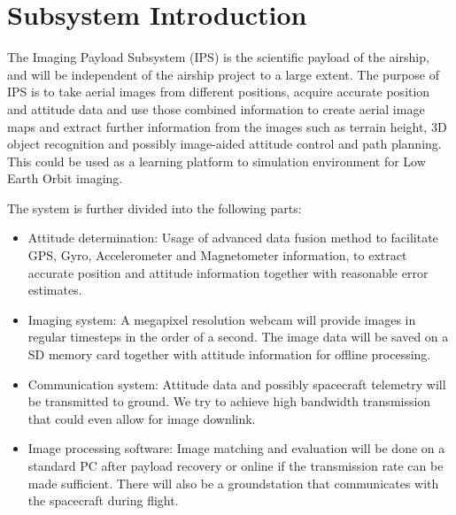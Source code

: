 \documentclass[fontsize=11pt,paper=a4,]{scrartcl}
\begin{document}
\sloppy



\pagestyle{plain}



\listoffigures
\newpage

\listoftables
\newpage

\tableofcontents
\newpage
\acresetall	%
\clearpage %
\pagestyle{fancy}




\section{Subsystem Introduction}
The Imaging Payload Subsystem (IPS) is the scientific payload of the airship, and will be independent of the airship project to a large extent.
The purpose of IPS is to take aerial images from different positions, acquire accurate position and attitude data and use those combined information to create aerial image maps and extract further information from the images such as terrain height, 3D object recognition and possibly image-aided attitude control and path planning.
This could be used as a learning platform to simulation environment for Low Earth Orbit imaging.

The system is further divided into the following parts:
\begin{itemize}
\item Attitude determination: Usage of advanced data fusion method to facilitate GPS, Gyro, Accelerometer and Magnetometer information, to extract accurate position and attitude information together with reasonable error estimates.
\item Imaging system: A megapixel resolution webcam will provide images in regular timesteps in the order of a second.
The image data will be saved on a SD memory card together with attitude information for offline processing.
\item Communication system: Attitude data and possibly spacecraft telemetry will be transmitted to ground.
We try to achieve high bandwidth transmission that could even allow for image downlink.
\item Image processing software:
Image matching and evaluation will be done on a standard PC after payload recovery or online if the transmission rate can be made sufficient.
There will also be a groundstation that communicates with the spacecraft during flight.
\end{itemize}
\end{document}
